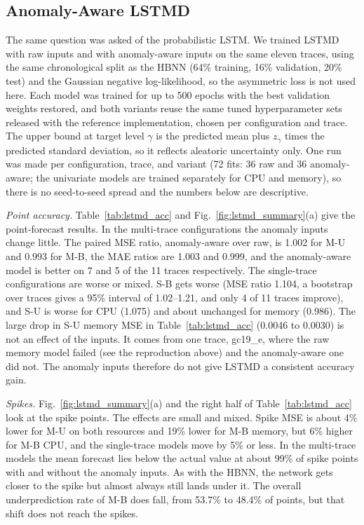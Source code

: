 \subsection{Anomaly-Aware LSTMD}
\label{sec:lstmd_results}

The same question was asked of the probabilistic LSTM. We trained LSTMD with raw inputs and with anomaly-aware inputs on the same eleven traces, using the same chronological split as the HBNN (64\% training, 16\% validation, 20\% test) and the Gaussian negative log-likelihood, so the asymmetric loss is not used here. Each model was trained for up to 500 epochs with the best validation weights restored, and both variants reuse the same tuned hyperparameter sets released with the reference implementation, chosen per configuration and trace. The upper bound at target level $\gamma$ is the predicted mean plus $z_\gamma$ times the predicted standard deviation, so it reflects aleatoric uncertainty only. One run was made per configuration, trace, and variant (72 fits: 36 raw and 36 anomaly-aware; the univariate models are trained separately for CPU and memory), so there is no seed-to-seed spread and the numbers below are descriptive. 

\textit{Point accuracy.}
Table~\ref{tab:lstmd_acc} and Fig.~\ref{fig:lstmd_summary}(a) give the point-forecast results. In the multi-trace configurations the anomaly inputs change little. The paired MSE ratio, anomaly-aware over raw, is 1.002 for M-U and 0.993 for M-B, the MAE ratios are 1.003 and 0.999, and the anomaly-aware model is better on 7 and 5 of the 11 traces respectively. The single-trace configurations are worse or mixed. S-B gets worse (MSE ratio 1.104, a bootstrap over traces gives a 95\% interval of 1.02--1.21, and only 4 of 11 traces improve), and S-U is worse for CPU (1.075) and about unchanged for memory (0.986). The large drop in S-U memory MSE in Table~\ref{tab:lstmd_acc} (0.0046 to 0.0030) is not an effect of the inputs. It comes from one trace, gc19\_e, where the raw memory model failed (see the reproduction above) and the anomaly-aware one did not. The anomaly inputs therefore do not give LSTMD a consistent accuracy gain.

\textit{Spikes.}
Fig.~\ref{fig:lstmd_summary}(a) and the right half of Table~\ref{tab:lstmd_acc} look at the spike points. The effects are small and mixed. Spike MSE is about 4\% lower for M-U on both resources and 19\% lower for M-B memory, but 6\% higher for M-B CPU, and the single-trace models move by 5\% or less. In the multi-trace models the mean forecast lies below the actual value at about 99\% of spike points with and without the anomaly inputs. As with the HBNN, the network gets closer to the spike but almost always still lands under it. The overall underprediction rate of M-B does fall, from 53.7\% to 48.4\% of points, but that shift does not reach the spikes.

